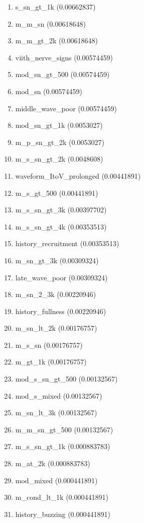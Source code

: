 \begin{enumerate}
\item s\_sn\_gt\_1k (0.00662837)
\item m\_m\_sn (0.00618648)
\item m\_m\_gt\_2k (0.00618648)
\item viith\_nerve\_signs (0.00574459)
\item mod\_sn\_gt\_500 (0.00574459)
\item mod\_sn (0.00574459)
\item middle\_wave\_poor (0.00574459)
\item mod\_sn\_gt\_1k (0.0053027)
\item m\_p\_sn\_gt\_2k (0.0053027)
\item m\_s\_sn\_gt\_2k (0.0048608)
\item waveform\_ItoV\_prolonged (0.00441891)
\item m\_s\_gt\_500 (0.00441891)
\item m\_s\_sn\_gt\_3k (0.00397702)
\item m\_s\_sn\_gt\_4k (0.00353513)
\item history\_recruitment (0.00353513)
\item m\_sn\_gt\_3k (0.00309324)
\item late\_wave\_poor (0.00309324)
\item m\_sn\_2\_3k (0.00220946)
\item history\_fullness (0.00220946)
\item m\_sn\_lt\_2k (0.00176757)
\item m\_s\_sn (0.00176757)
\item m\_gt\_1k (0.00176757)
\item mod\_s\_sn\_gt\_500 (0.00132567)
\item mod\_s\_mixed (0.00132567)
\item m\_sn\_lt\_3k (0.00132567)
\item m\_m\_sn\_gt\_500 (0.00132567)
\item m\_s\_sn\_gt\_1k (0.000883783)
\item m\_at\_2k (0.000883783)
\item mod\_mixed (0.000441891)
\item m\_cond\_lt\_1k (0.000441891)
\item history\_buzzing (0.000441891)
\end{enumerate}